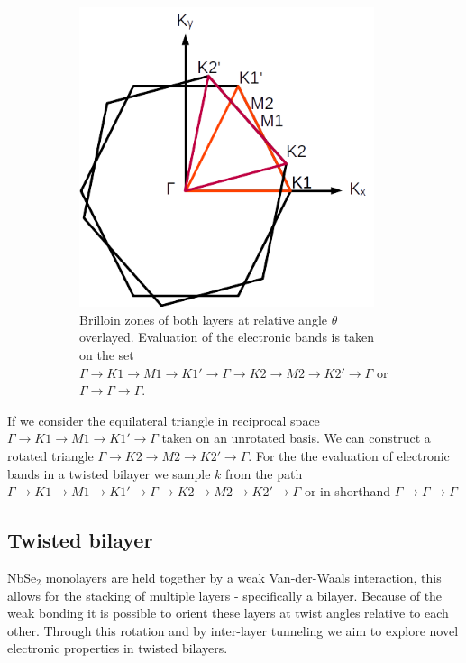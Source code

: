 \documentclass[10pt, twocolumn]{article} %
\begin{document}
\begin{figure}[t]
\begin{subfigure}[t]{0.45\textwidth}
    \includegraphics[width=0.95\textwidth]{heterostructure_BZ_path.png}
    \caption{
      Brilloin zones of both layers at relative angle $\theta$ overlayed. Evaluation of the electronic bands is taken on the set $\Gamma \rightarrow K1 \rightarrow M1 \rightarrow K1' \rightarrow \Gamma \rightarrow K2 \rightarrow M2 \rightarrow K2' \rightarrow \Gamma$ or $\Gamma \rightarrow \Gamma \rightarrow \Gamma$.
    }
  \end{subfigure}
  \caption{
  }
\end{figure}

  If we consider the equilateral triangle in reciprocal space $\Gamma \rightarrow K1 \rightarrow M1 \rightarrow K1' \rightarrow \Gamma$ taken on an unrotated basis. We can construct a rotated triangle $\Gamma \rightarrow K2 \rightarrow M2 \rightarrow K2' \rightarrow \Gamma$. For the the evaluation of electronic bands in a twisted bilayer we sample $k$ from the path $\Gamma \rightarrow K1 \rightarrow M1 \rightarrow K1' \rightarrow \Gamma \rightarrow K2 \rightarrow M2 \rightarrow K2' \rightarrow \Gamma$ or in shorthand $\Gamma \rightarrow \Gamma \rightarrow \Gamma$

\subsection*{Twisted bilayer}

  NbSe$_2$ monolayers are held together by a weak Van-der-Waals interaction, this allows for the stacking of multiple layers - specifically a bilayer. Because of the weak bonding it is possible to orient these layers at twist angles relative to each other. Through this rotation and by inter-layer tunneling we aim to explore novel electronic properties in twisted bilayers.
\end{document}
